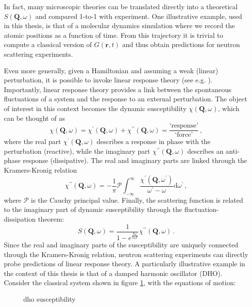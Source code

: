 In fact, many microscopic theories can be translated directly into a theoretical $S(\bm{Q}, \omega)$ and compared 1-to-1 with experiment. One illustrative example, used in this thesis, is that of a molecular dynamics simulation where we record the atomic positions as a function of time. From this trajectory it is trivial to compute a classical version of $G(\bm{r},t)$ and thus obtain predictions for neutron scattering experiments.

Even more generally, given a Hamiltonian and assuming a weak (linear) perturbation, it is possible to invoke linear response theory (see e.g. \cite[chapter 3]{Jensen1991}). Importantly, linear response theory provides a link between the spontaneous fluctuations of a system and the response to an external perturbation. The object of interest in this context becomes the dynamic susceptibility $\chi(\bm{Q}, \omega)$, which can be thought of as
%
\[ \chi(\bm{Q}, \omega) = \chi^{\prime}(\bm{Q}, \omega) + \chi^{\prime\prime}(\bm{Q}, \omega) = \frac{\text{`response'}}{\text{`force'}} \, , \]
%
where the real part $\chi^{\prime}(\bm{Q}, \omega)$ describes a response in phase with the perturbation (reactive),
while the imaginary part $\chi^{\prime\prime}(\bm{Q}, \omega)$ describes an anti-phase response (dissipative). The real and imaginary parts are linked through the Kramers-Kronig relation
%
\[ \chi^{\prime\prime}(\bm{Q}, \omega) = - \frac{1}{\pi} \mathcal{P} \int_{-\infty}^{\infty} \frac{\chi^{\prime}(\bm{Q},\omega^\prime)}{\omega^\prime - \omega} \mathrm{d}\omega^\prime \, , \]
%
where $\mathcal{P}$ is the Cauchy principal value. Finally, the scattering function is related to the imaginary part of dynamic susceptibility through the fluctuation-dissipation theorem:
%
\[ S(\bm{Q},\omega) = \frac{1}{1-e^{\frac{\hbar\omega}{k_\text{B}T}}} \chi^{\prime\prime}(\bm{Q}, \omega) \, . \]
%
Since the real and imaginary parts of the susceptibility are uniquely connected through the Kramers-Kronig relation, neutron scattering experiments can directly probe predictions of linear response theory. A particularly illustrative example in the context of this thesis is that of a damped harmonic oscillator (DHO). Consider the classical system shown in figure \ref{fig:dho_chi}, with the equations of motion:

\begin{figure}[]
	\centering
	\caption[DHO susceptibility]{dho susceptibility}
	\label{fig:dho_chi}
\end{figure}

